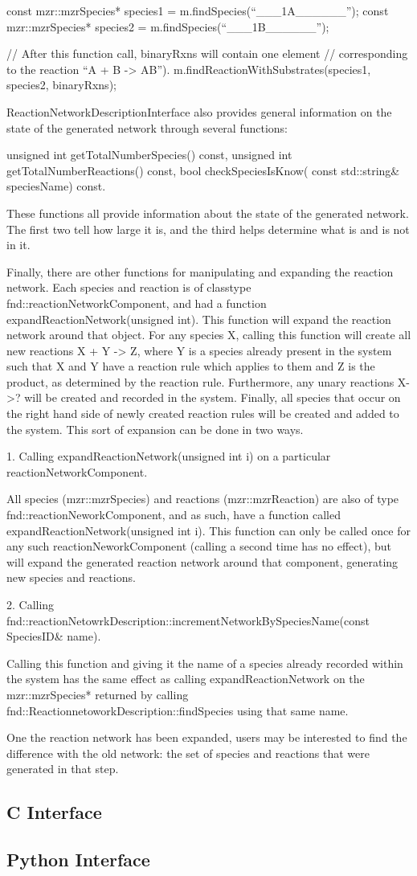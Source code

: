 const mzr::mzrSpecies* species1 = m.findSpecies(``___1A______'');
const mzr::mzrSpecies* species2 = m.findSpecies(``___1B______'');

// After this function call, binaryRxns will contain one element
// corresponding to the reaction ``A + B -> AB'').
m.findReactionWithSubstrates(species1, species2, binaryRxns);


ReactionNetworkDescriptionInterface also provides general information
on the state of the generated network through several functions:

unsigned int getTotalNumberSpecies() const, 
unsigned int getTotalNumberReactions() const,
bool checkSpeciesIsKnow( const std::string& speciesName) const.

These functions all provide information about the state of the
generated network.  The first two tell how large it is, and the third
helps determine what is and is not in it.  

Finally, there are other functions for manipulating and expanding the
reaction network.  Each species and reaction is of classtype
fnd::reactionNetworkComponent, and had a function
expandReactionNetwork(unsigned int).  This function will expand the
reaction network around that object.  For any species X, calling this
function will create all new reactions X + Y -> Z, where Y is a species
already present in the system such that X and Y have a reaction rule
which applies to them and Z is the product, as determined by the
reaction rule.  Furthermore, any unary reactions X->? will be created
and recorded in the system.  Finally, all species that occur on the
right hand side of newly created reaction rules will be created and
added to the system.  This sort of expansion can be done in two ways.

1.  Calling expandReactionNetwork(unsigned int i) on a particular
reactionNetworkComponent.

All species (mzr::mzrSpecies) and reactions (mzr::mzrReaction) are
also of type fnd::reactionNeworkComponent, and as such, have a function
called expandReactionNetwork(unsigned int i).  This function can only
be called once for any such reactionNeworkComponent (calling a second
time has no effect), but will expand the generated reaction network
around that component, generating new species and reactions.


2.  Calling
fnd::reactionNetowrkDescription::incrementNetworkBySpeciesName(const
SpeciesID& name).  

Calling this function and giving it the name of a species already
recorded within the system has the same effect as calling
expandReactionNetwork on the mzr::mzrSpecies* returned by calling
fnd::ReactionnetoworkDescription::findSpecies using that same name. 

One the reaction network has been expanded, users may be interested to
find the difference with the old network: the set of species and
reactions that were generated in that step.  





\subsection{C Interface}
\subsection{Python Interface}



